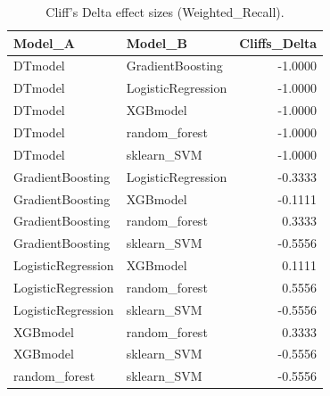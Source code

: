 \begin{table}[t]
\centering
\begin{tabular}{llr}
\toprule
Model_A & Model_B & Cliffs_Delta \\
\midrule
DTmodel & GradientBoosting & -1.0000 \\
DTmodel & LogisticRegression & -1.0000 \\
DTmodel & XGBmodel & -1.0000 \\
DTmodel & random_forest & -1.0000 \\
DTmodel & sklearn_SVM & -1.0000 \\
GradientBoosting & LogisticRegression & -0.3333 \\
GradientBoosting & XGBmodel & -0.1111 \\
GradientBoosting & random_forest & 0.3333 \\
GradientBoosting & sklearn_SVM & -0.5556 \\
LogisticRegression & XGBmodel & 0.1111 \\
LogisticRegression & random_forest & 0.5556 \\
LogisticRegression & sklearn_SVM & -0.5556 \\
XGBmodel & random_forest & 0.3333 \\
XGBmodel & sklearn_SVM & -0.5556 \\
random_forest & sklearn_SVM & -0.5556 \\
\bottomrule
\end{tabular}
\caption{Cliff's Delta effect sizes (Weighted_Recall).}
\label{tab:cliffs_Weighted_Recall}
\end{table}